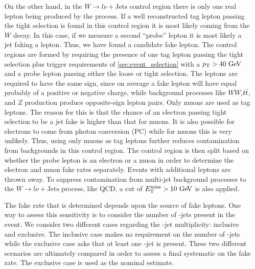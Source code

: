 On the other hand, in the 
$W\rightarrow l\nu + \textrm{Jets}$ control region there
is only one real lepton being produced by the process.
If a well reconstructed tag lepton passing the tight selection
is found in this control 
region it is most likely coming from the $W$ decay.
In this case, if we measure a second ``probe'' lepton it is most likely
a jet faking a lepton. Thus, we have found a candidate fake lepton.
The control regions are formed by requiring the presence
of one tag lepton passing the tight selection
plus trigger requirements
of \sec\ref{sec:event_selection} with a $\pt>40\GeV$ and 
a probe lepton passing either the loose or tight selection.
The leptons are required to have the same sign, since
on average a fake lepton will have equal probably of
a positive or negative charge, while background processes
like $WW$,$t\bar{t}$, and $Z$ production produce opposite-sign lepton
pairs.  Only muons are used as tag leptons. 
The reason for this is that the chance of an electron passing tight selection
to be a jet fake is higher than that for muons. It is also 
possible for electrons to come from photon conversion  (PC)
while for muons this is very unlikely. Thus, using only muons as tag
leptons further reduces contamination from backgrounds in this control
region. The control region is then split based on whether the probe
lepton is an electron or a muon in order to determine the electron
and muon fake rates separately.
Events with additional leptons are thrown away.
To suppress contamination from multi-jet background processes
to the $W\rightarrow l\nu + \textrm{Jets}$ process, like QCD,
a cut of $\met>10\GeV$ is also applied.

The fake rate that is determined depends upon the source of fake leptons.
One way to assess this sensitivity is to consider the number of
\bee-jets present in the event. We consider two different
cases regarding the \bee-jet multiplicity: inclusive and exclusive.
The inclusive case makes no requirement on the number of \bee-jets
while the exclusive case asks that at least one \bee-jet is present.
These two different scenarios are ultimately compared in order to assess
a final systematic on the fake rate. The exclusive case
is used as the nominal estimate.


